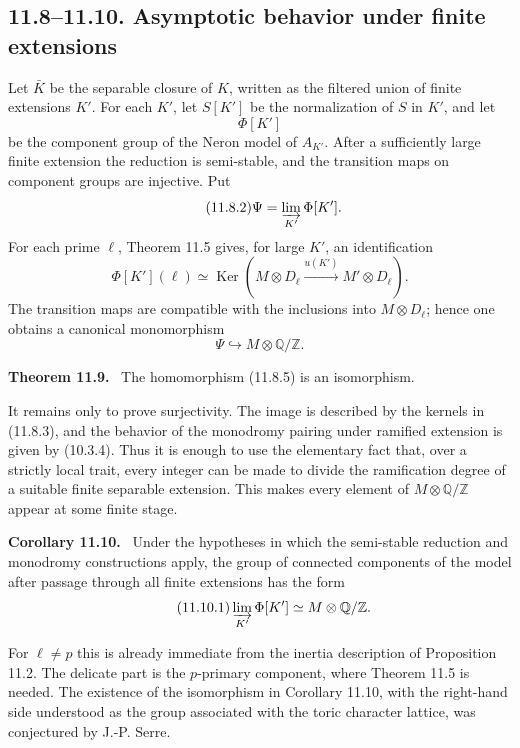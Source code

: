 \documentclass[11pt]{article}
\newcommand{\Ker}{\operatorname{Ker}}
\newcommand{\Z}{\mathbb Z}
\newcommand{\Q}{\mathbb Q}
\newcommand{\Dl}{D_\ell}
\newenvironment{statement}[1]{\par\medskip\noindent\textbf{#1.}\ }{\par\medskip}
\begin{document}
\subsection*{11.8--11.10. Asymptotic behavior under finite extensions}
Let \(\bar K\) be the separable closure of \(K\), written as the filtered union of finite extensions \(K'\).  For each \(K'\), let \(S[K']\) be the normalization of \(S\) in \(K'\), and let
\begin{equation}\tag{11.8.1}
        \Phi[K']
\end{equation}
be the component group of the Neron model of \(A_{K'}\).  After a sufficiently large finite extension the reduction is semi-stable, and the transition maps on component groups are injective.  Put
\begin{equation}\tag{11.8.2}
        \Psi=\varinjlim_{K'}\Phi[K'].
\end{equation}
For each prime \(\ell\), Theorem 11.5 gives, for large \(K'\), an identification
\begin{equation}\tag{11.8.3}
        \Phi[K'](\ell)\simeq
        \Ker(M\otimes\Dl\xrightarrow{u(K')}M'\otimes\Dl).
\end{equation}
The transition maps are compatible with the inclusions into \(M\otimes\Dl\); hence one obtains a canonical monomorphism
\begin{equation}\tag{11.8.5}
        \Psi\hookrightarrow M\otimes\Q/\Z.
\end{equation}

\begin{statement}{Theorem 11.9}
The homomorphism (11.8.5) is an isomorphism.
\end{statement}
It remains only to prove surjectivity.  The image is described by the kernels in (11.8.3), and the behavior of the monodromy pairing under ramified extension is given by (10.3.4).  Thus it is enough to use the elementary fact that, over a strictly local trait, every integer can be made to divide the ramification degree of a suitable finite separable extension.  This makes every element of \(M\otimes\Q/\Z\) appear at some finite stage.

\begin{statement}{Corollary 11.10}
Under the hypotheses in which the semi-stable reduction and monodromy constructions apply, the group of connected components of the model after passage through all finite extensions has the form
\begin{equation}\tag{11.10.1}
        \varinjlim_{K'}\Phi[K']\simeq M\otimes\Q/\Z.
\end{equation}
\end{statement}
For \(\ell\ne p\) this is already immediate from the inertia description of Proposition 11.2.  The delicate part is the \(p\)-primary component, where Theorem 11.5 is needed.  The existence of the isomorphism in Corollary 11.10, with the right-hand side understood as the group associated with the toric character lattice, was conjectured by J.-P. Serre.
\end{document}
